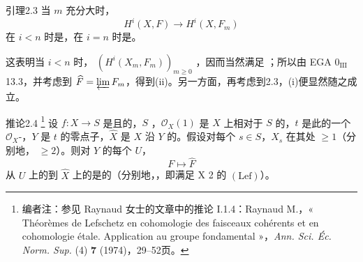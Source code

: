 \begin{SGAresult}{引理}{2.3}
当 $m$ 充分大时，
\[
 H^i(X,F)\longrightarrow H^i(X,F_m)
\]
在 $i<n$ 时是，在 $i=n$ 时是。
\end{SGAresult}
这表明当 $i<n$ 时， $(H^i(X_m,F_m))_{m\geq0}$ ，因而当然满足 ；所以由 EGA $0_{\mathrm{III}}$ 13.3，并考虑到 $\widehat F=\varprojlim F_m$，得到(ii)。另一方面，再考虑到2.3，(i)便显然随之成立。
\begin{SGAresult}{推论}{2.4}
\footnote{编者注：参见 Raynaud 女士的文章中的推论 I.1.4：Raynaud M.，« Théorèmes de Lefschetz en cohomologie des faisceaux cohérents et en cohomologie étale. Application au groupe fondamental »，\emph{Ann. Sci. Éc. Norm. Sup.} (4) \textbf{7} (1974)，29--52页。}
设 $f:X\to S$ 是且的，$S$ ，$\mathcal O_X(1)$ 是 $X$ 上相对于 $S$ 的，$t$ 是此的一个 $\mathcal O_X$-，$Y$ 是 $t$ 的零点子，$\widehat X$ 是 $X$ 沿 $Y$ 的。假设对每个 $s\in S$，$X_s$ 在其处 $\geq1$（分别地， $\geq2$）。则对 $Y$ 的每个 $U$，
\[
 F\longmapsto\widehat F
\]
从 $U$ 上的到 $\widehat X$ 上的是的（分别地，，即满足 X 2 的  $(\mathrm{Lef})$）。
\end{SGAresult}
